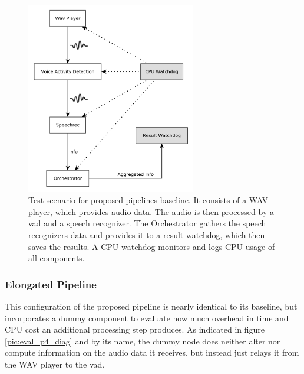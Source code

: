 \begin{figure}[]
	\centering
	\includegraphics[width=0.66\textwidth]{diagrams/eval_pipeline_2.pdf}
	\caption{Test scenario for proposed pipelines baseline.
		It consists of a WAV player, which provides audio data.
		The audio is then processed by a \gls{vad} and a speech recognizer.
		The Orchestrator gathers the speech recognizers data and provides it to a result watchdog, which then saves the results.
		A CPU watchdog monitors and logs CPU usage of all components.}
	\label{pic:eval_p2_diag}
\end{figure}


\subsubsection{Elongated Pipeline}
This configuration of the proposed pipeline is nearly identical to its baseline, but incorporates a dummy component to evaluate how much overhead in time and CPU cost an additional processing step produces.
As indicated in figure \ref{pic:eval_p4_diag} and by its name, the dummy node does neither alter nor compute information on the audio data it receives, but instead just relays it from the WAV player to the \gls{vad}.

